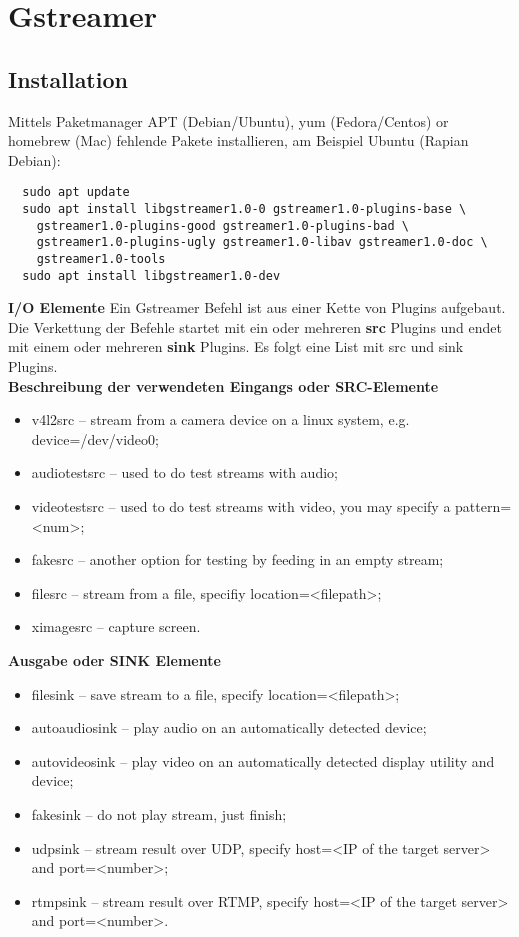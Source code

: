 \section{Gstreamer}

\subsection{Installation}
Mittels Paketmanager APT (Debian/Ubuntu), yum (Fedora/Centos) or homebrew (Mac) 
fehlende Pakete installieren, am Beispiel Ubuntu (Rapian Debian):
\begin{verbatim}
  sudo apt update 
  sudo apt install libgstreamer1.0-0 gstreamer1.0-plugins-base \
    gstreamer1.0-plugins-good gstreamer1.0-plugins-bad \
    gstreamer1.0-plugins-ugly gstreamer1.0-libav gstreamer1.0-doc \
    gstreamer1.0-tools
  sudo apt install libgstreamer1.0-dev
\end{verbatim}

\textbf{I/O Elemente}
Ein Gstreamer Befehl ist aus einer Kette von Plugins aufgebaut. Die Verkettung der Befehle startet mit ein oder mehreren \textbf{src} Plugins und endet mit einem oder mehreren \textbf{sink} Plugins. Es folgt eine List mit src und sink Plugins.\\

\textbf{Beschreibung der verwendeten Eingangs oder SRC-Elemente}
\begin{itemize}
\item v4l2src – stream from a camera device on a linux system, e.g. device=/dev/video0;
\item audiotestsrc – used to do test streams with audio;
\item videotestsrc – used to do test streams with video, you may specify a pattern=<num>;
\item fakesrc – another option for testing by feeding in an empty stream;
\item filesrc – stream from a file, specifiy location=<filepath>;
\item ximagesrc – capture screen.
\end{itemize}

\textbf{Ausgabe oder SINK Elemente}
\begin{itemize}
\item filesink – save stream to a file, specify location=<filepath>;
\item  autoaudiosink – play audio on an automatically detected device;
\item  autovideosink – play video on an automatically detected display utility and device;
\item  fakesink – do not play stream, just finish;
\item  udpsink – stream result over UDP, specify host=<IP of the target server> and port=<number>;
\item rtmpsink – stream result over RTMP, specify host=<IP of the target server> and port=<number>.
\end{itemize}

